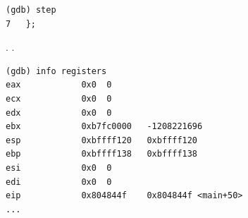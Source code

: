\begin{lstlisting}
(gdb) step
7	};
\end{lstlisting}

. 
\EAX {}.

\begin{lstlisting}
(gdb) info registers
eax            0x0	0
ecx            0x0	0
edx            0x0	0
ebx            0xb7fc0000	-1208221696
esp            0xbffff120	0xbffff120
ebp            0xbffff138	0xbffff138
esi            0x0	0
edi            0x0	0
eip            0x804844f	0x804844f <main+50>
...
\end{lstlisting}
\fi
\fi
